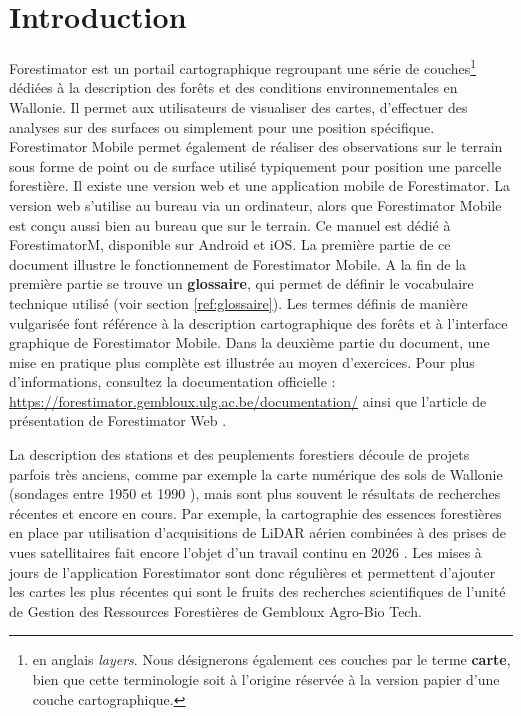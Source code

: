 \documentclass[12pt,a4paper]{report}
\begin{document}
\section{Introduction}
Forestimator est un portail cartographique regroupant une série de \glspl{couche}\footnote{en anglais \textit{layers}. Nous désignerons également ces couches par le terme \textbf{carte}, bien que cette terminologie soit à l'origine réservée à la version papier d'une couche cartographique.}  dédiées à la description des forêts et des conditions environnementales en Wallonie. Il permet aux utilisateurs de visualiser des cartes, d'effectuer des analyses sur des surfaces ou simplement pour une position spécifique. Forestimator Mobile permet également de réaliser des observations sur le terrain sous forme de point ou de surface utilisé typiquement pour position une parcelle forestière. Il existe une version web et une application mobile de Forestimator. La version web s'utilise au bureau via un ordinateur, alors que Forestimator Mobile est conçu aussi bien au bureau que sur le terrain. Ce manuel est dédié à \gls{ForestimatorM}, disponible sur Android et iOS. La première partie de ce document illustre le fonctionnement de Forestimator Mobile. A la fin de la première partie se trouve un \textbf{glossaire}, qui permet de définir le vocabulaire technique utilisé (voir section \ref{ref:glossaire}). Les termes définis de manière vulgarisée font référence à la description cartographique des forêts et à l'interface graphique de Forestimator Mobile. Dans la deuxième partie du document, une mise en pratique plus complète est illustrée au moyen d'exercices. Pour plus d'informations, consultez la documentation officielle : \url{https://forestimator.gembloux.ulg.ac.be/documentation/} ainsi que l'article de présentation de Forestimator Web \citep{lisein_forestimator_2022}.

La description des \glspl{station} et des peuplements forestiers découle de projets parfois très anciens, comme par exemple la carte numérique des sols de Wallonie (sondages entre 1950 et 1990 \citep{bah_legende_2007}), mais sont plus souvent le résultats de recherches récentes et encore en cours. Par exemple, la cartographie des essences forestières en place par utilisation d'acquisitions de LiDAR aérien combinées à des prises de vues satellitaires fait encore l'objet d'un travail continu en 2026 \citep{bolyn_carte_2020}. Les mises à jours de l'application Forestimator sont donc régulières et permettent d'ajouter les cartes les plus récentes qui sont le fruits des recherches scientifiques de l'unité de Gestion des Ressources Forestières de Gembloux Agro-Bio Tech.
\end{document}
